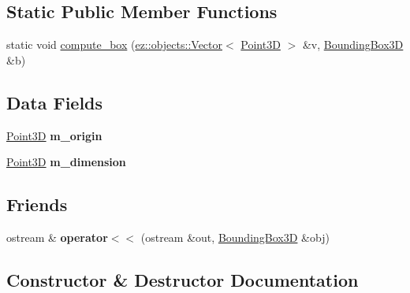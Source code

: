 \subsection*{Static Public Member Functions}
\begin{DoxyCompactItemize}
\item 
static void \hyperlink{classez_1_1maths_1_1BoundingBox3D_a64f9ec4f9a6f62e9d253526733f630d5}{compute\+\_\+box} (\hyperlink{classez_1_1objects_1_1Vector}{ez\+::objects\+::\+Vector}$<$ \hyperlink{classez_1_1maths_1_1Point3D}{Point3D} $>$ \&v, \hyperlink{classez_1_1maths_1_1BoundingBox3D}{Bounding\+Box3D} \&b)
\end{DoxyCompactItemize}
\subsection*{Data Fields}
\begin{DoxyCompactItemize}
\item 
\mbox{\label{classez_1_1maths_1_1BoundingBox3D_ad93421fd16aa004ad0caf9ec9dae8f63}} 
\hyperlink{classez_1_1maths_1_1Point3D}{Point3D} {\bfseries m\+\_\+origin}
\item 
\mbox{\label{classez_1_1maths_1_1BoundingBox3D_ac237f04a44c7a380df70e585f71c958c}} 
\hyperlink{classez_1_1maths_1_1Point3D}{Point3D} {\bfseries m\+\_\+dimension}
\end{DoxyCompactItemize}
\subsection*{Friends}
\begin{DoxyCompactItemize}
\item 
\mbox{\label{classez_1_1maths_1_1BoundingBox3D_a82bf56a0187cec6d234de15d321c78b4}} 
ostream \& {\bfseries operator$<$$<$} (ostream \&out, \hyperlink{classez_1_1maths_1_1BoundingBox3D}{Bounding\+Box3D} \&obj)
\end{DoxyCompactItemize}


\subsection{Constructor \& Destructor Documentation}
\mbox{\label{classez_1_1maths_1_1BoundingBox3D_a81a912b95fbb8c30afd2550ef8b77f61}} 
